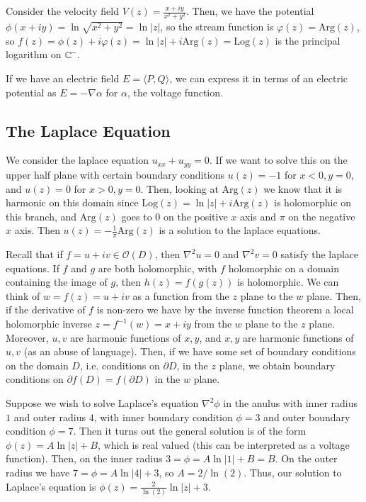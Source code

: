 \documentclass[12pt, a4paper, oneside, openright, titlepage]{book}
\begin{document}
\begin{eg}
    Consider the velocity field $V(z) = \frac{x+iy}{x^2+y^2}$. Then, we have the potential $\phi(x+iy) = \ln\sqrt{x^2+y^2} = \ln|z|$, so the stream function is $\varphi(z) = \text{Arg}(z)$, so $f(z) = \phi(z)+i\varphi(z) = \ln|z|+i\text{Arg}(z) = \text{Log}(z)$ is the principal logarithm on $\mathbb C^-$. 
\end{eg}


If we have an electric field $E = \langle P,Q\rangle$, we can express it in terms of an electric potential as $E = -\nabla \alpha$ for $\alpha$, the voltage function. 

\subsection{The Laplace Equation}

We consider the laplace equation $u_{xx}+u_{yy} = 0$. If we want to solve this on the upper half plane with certain boundary conditions $u(z) = -1$ for $x < 0, y = 0$, and $u(z) = 0$ for $x > 0, y = 0$. Then, looking at $\text{Arg}(z)$ we know that it is harmonic on this domain since $\text{Log}(z) = \ln|z| + i\text{Arg}(z)$ is holomorphic on this branch, and $\text{Arg}(z)$ goes to $0$ on the positive $x$ axis and $\pi$ on the negative $x$ axis. Then $u(z) = -\frac{1}{\pi}\text{Arg}(z)$ is a solution to the laplace equations. 

Recall that if $f=u+iv \in \mathcal{O}(D)$, then $\nabla^2u = 0$ and $\nabla^2v = 0$ satisfy the laplace equations. If $f$ and $g$ are both holomorphic, with $f$ holomorphic on a domain containing the image of $g$, then $h(z) = f(g(z))$ is holomorphic. We can think of $w = f(z) = u+iv$ as a function from the $z$ plane to the $w$ plane. Then, if the derivative of $f$ is non-zero we have by the inverse function theorem a local holomorphic inverse $z = f^{-1}(w) = x+iy$ from the $w$ plane to the $z$ plane. Moreover, $u,v$ are harmonic functions of $x,y$, and $x,y$ are harmonic functions of $u,v$ (as an abuse of language). Then, if we have some set of boundary conditions on the domain $D$, i.e. conditions on $\partial D$, in the $z$ plane, we obtain boundary conditions on $\partial f(D) = f(\partial D)$ in the $w$ plane.

\begin{eg}
    Suppose we wish to solve Laplace's equation $\nabla^2\phi$ in the anulus with inner radius $1$ and outer radius $4$, with inner boundary condition $\phi = 3$ and outer boundary condition $\phi = 7$. Then it turns out the general solution is of the form $\phi(z) = A\ln|z| +B$, which is real valued (this can be interpreted as a voltage function). Then, on the inner radius $3 = \phi = A\ln|1| + B = B$. On the outer radius we have $7 = \phi = A\ln|4| + 3$, so $A = 2/\ln(2)$. Thus, our solution to Laplace's equation is $\phi(z) = \frac{2}{\ln(2)}\ln|z| + 3$.
\end{eg}
\end{document}
